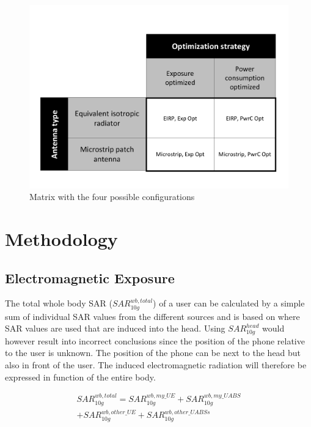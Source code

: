 \documentclass[twocolumn]{phdsymp} %
\begin{document}
\begin{figure}[h!]
  \includegraphics[width=\linewidth]{fourCasesMatrix.pdf}
  \caption{Matrix with the four possible configurations}
  \label{fig:fourCasesMatrix}
\end{figure}

\section{Methodology}

\subsection{Electromagnetic Exposure}


The total whole body SAR ($SAR^{wb,total}_{10g}$) of a user can be calculated by a simple sum of individual SAR values from the different sources
and is based on \cite{J17_kuehn2019modelling} where SAR values are used that are induced into the head.
Using $SAR^{head}_{10g}$ would however result into incorrect conclusions since 
the position of the phone relative to the user is unknown. 
The position of the phone can be next to the head but also in front of the user.
The induced electromagnetic radiation will therefore be expressed in function of the entire body.


\begin{equation} 
\begin{aligned}
SAR^{wb,total}_{10g} = SAR^{wb,my\_UE}_{10g} +  SAR^{wb,my\_UABS}_{10g} \\
+ SAR^{wb,other\_UE}_{10g} + SAR^{wb,other\_UABSs}_{10g}
\end{aligned}
\label{eq:overallSARwb}
\end{equation}
\end{document}
